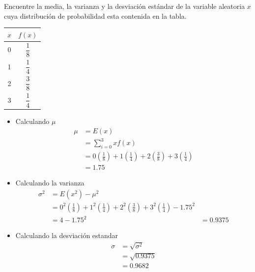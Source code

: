 \begin{ejemplo}
    Encuentre la media, la varianza y la desviación estándar de la variable aleatoria $x$ cuya distribución de probabilidad esta contenida en la tabla.
    \begin{table}[H]
        \centering
        \begin{tabular}{cc}\hline
            $x$ & $f(x)$         \\ \hline
            0   & $\dfrac{1}{8}$ \\
            1   & $\dfrac{1}{4}$ \\
            2   & $\dfrac{3}{8}$ \\
            3   & $\dfrac{1}{4}$ \\ \hline
        \end{tabular}
    \end{table}
    \begin{itemize}
        \item Calculando $\mu$
              \begin{align*}
                  \mu & = E(x)                                                                                                    \\
                      & = \sum_{i=0}^3 xf(x)                                                                                      \\
                      & = 0\left(\frac{1}{8}\right)+1\left(\frac{1}{4}\right)+2\left(\frac{3}{8}\right)+3\left(\frac{1}{4}\right) \\
                      & = 1.75
              \end{align*}
        \item Calculando la varianza
              \begin{align*}
                  \sigma^2 & = E(x^2) - \mu^2                                                                                                           \\
                           & = 0^2\left(\frac{1}{8}\right)+1^2\left(\frac{1}{4}\right)+2^2\left(\frac{3}{8}\right)+3^2\left(\frac{1}{4}\right) - 1.75^2 \\
                           & = 4-1.75^2
                           & = 0.9375
              \end{align*}
        \item  Calculando la desviación estandar
              \begin{align*}
                  \sigma & = \sqrt{\sigma^2 } \\
                         & = \sqrt{0.
                      9375}                   \\
                         & = 0.9682
              \end{align*}
    \end{itemize}
\end{ejemplo}